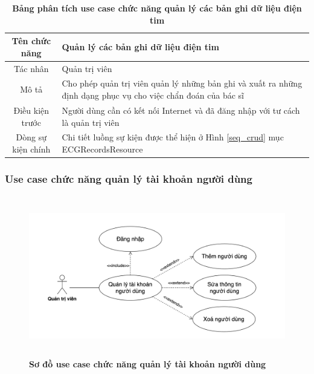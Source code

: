   \begin{table}[H]
    \caption{\bfseries \fontsize{12pt}{0pt}\selectfont Bảng phân tích use case chức năng quản lý các bản ghi dữ liệu điện tim}
    \centering
    \begin{tabularx}{0.9\textwidth}{|c|X|}
      \hline
      \textbf{Tên chức năng} & \textbf{Quản lý các bản ghi dữ liệu điện tim} \\
      \hline
      Tác nhân & Quản trị viên \\
      \hline
      Mô tả & Cho phép quản trị viên quản lý  những bản ghi và xuất ra những định dạng phục vụ cho việc chẩn đoán của bác sĩ \\
      \hline
      Điều kiện trước & Người dùng cần có kết nối Internet và đã đăng nhập với tư cách là quản trị viên \\
      \hline
      Dòng sự kiện chính & 
        Chi tiết luồng sự kiện được thể hiện ở Hình \ref{seq_crud} mục ECGRecordsResource\\
      \hline
    \end{tabularx}
  \end{table}

\subsubsection{Use case chức năng quản lý tài khoản người dùng}
  \begin{figure}[H]
    \centering
    \includegraphics[width=15cm,height=7cm]{Images/use_case/use_case_manage_users.png}
    \caption[Sơ đồ use case chức năng quản lý tài khoản người dùng]{\bfseries \fontsize{12pt}{0pt}
    \selectfont Sơ đồ use case chức năng quản lý tài khoản người dùng}
    \label{use_case_manage_users} %
  \end{figure}

